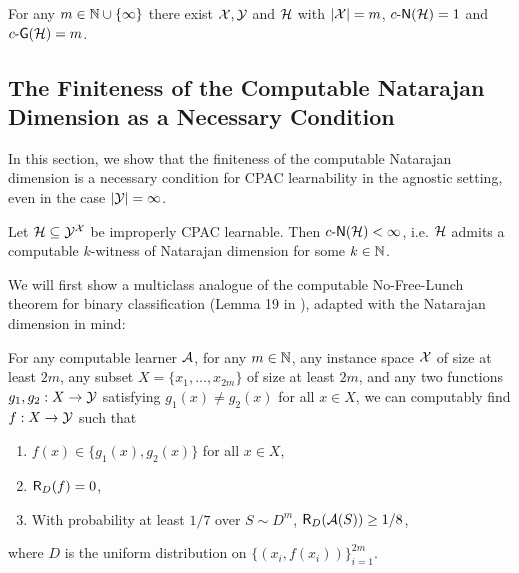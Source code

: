\documentclass[11pt]{article}
\begin{document}
\begin{proposition}
\label{prop:cndim-cgdim-gap}
    For any $m\in\mathbb{N}\cup\{\infty\}$ there exist $\mathcal{X},\mathcal{Y}$ and  $\mathcal{H}$ with $|\mathcal{X}|=m$, $c\text{-}\mathsf{N}(\mathcal{H})=1$ and $c\text{-}\mathsf{G}(\mathcal{H})=m$.
\end{proposition}

\subsection{The Finiteness of the Computable Natarajan Dimension as a Necessary Condition}
\label{sec:c-ndim-lb}

In this section, we show that the finiteness of the computable Natarajan dimension is a necessary condition for CPAC learnability in the agnostic setting, even in the case $|\mathcal{Y}|=\infty$. 

\begin{theorem}
\label{thm:m-cpac-lb-ndim}
    Let $\mathcal{H}\subseteq\mathcal{Y}^{\mathcal{X}}$ be improperly CPAC learnable.
    Then $c\text{-}\mathsf{N}(\mathcal{H})<\infty$, i.e. $\mathcal{H}$ admits a computable $k$-witness of Natarajan dimension for some $k\in\mathbb{N}$.
\end{theorem}

We will first show a multiclass analogue of the computable No-Free-Lunch theorem for binary classification (Lemma 19 in \citep{agarwal2020learnability}), adapted with the Natarajan dimension in mind:

\begin{lemma}
\label{lemma:cmnflt}
    For any computable learner $\mathcal{A}$, for any $m\in\mathbb{N}$, any instance space $\mathcal{X}$ of size at least $2m$, any subset $X=\{x_1,\dots,x_{2m}\}$ of size at least $2m$, and any two functions $g_1,g_2:X\rightarrow\mathcal{Y}$ satisfying $g_1(x)\neq g_2(x)$ for all $x\in X$, we can computably find $f:X\rightarrow\mathcal{Y}$ such that 
    \begin{enumerate}
        \item $f(x)\in\{g_1(x),g_2(x)\}$ for all $x\in X$,
        \item $\mathsf{R}_{D}(f)=0$,
        \item With probability at least $1/7$ over $S\sim D^m$, $\mathsf{R}_D(\mathcal{A}(S))\geq 1/8$,
    \end{enumerate}
    where $D$ is the uniform distribution on $\{(x_i, f(x_i))\}_{i=1}^{2m}$.
\end{lemma}
\end{document}
